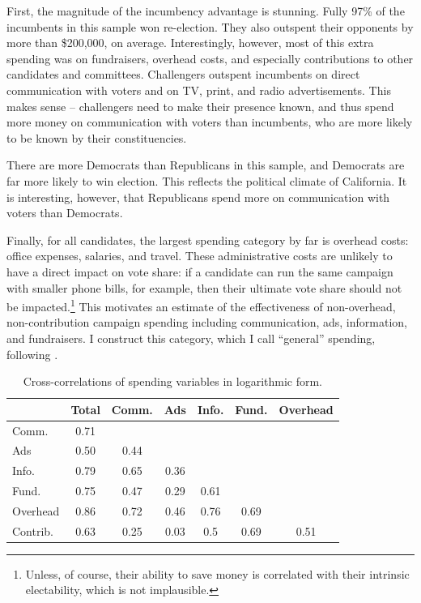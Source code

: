 \documentclass{article}
\begin{document}
First, the magnitude of the incumbency advantage is stunning. Fully 97\% of the incumbents in this sample won re-election. They also outspent their opponents by more than \$200,000, on average. Interestingly, however, most of this extra spending was on fundraisers, overhead costs, and especially contributions to other candidates and committees. Challengers outspent incumbents on direct communication with voters and on TV, print, and radio advertisements. This makes sense -- challengers need to make their presence known, and thus spend more money on communication with voters than incumbents, who are more likely to be known by their constituencies.

There are more Democrats than Republicans in this sample, and Democrats are far more likely to win election. This reflects the political climate of California. It is interesting, however, that Republicans spend more on communication with voters than Democrats.

Finally, for all candidates, the largest spending category by far is overhead costs: office expenses, salaries, and travel. These administrative costs are unlikely to have a direct impact on vote share: if a candidate can run the same campaign with smaller phone bills, for example, then their ultimate vote share should not be impacted.\footnote{Unless, of course, their ability to save money is correlated with their intrinsic electability, which is not implausible.} This motivates an estimate of the effectiveness of non-overhead, non-contribution campaign spending including communication, ads, information, and fundraisers. I construct this category, which I call ``general'' spending, following \cite{ansolabehere1994mismeasure}.

\begin{table}
\centering \caption{Cross-correlations of spending variables in logarithmic form. \label{table:corr}}
\begin{tabular}{l c  c  c  c  c  c  }\toprule
\multicolumn{1}{c}{} &Total&Comm.&Ads&Info.&Fund.&Overhead\\ \midrule
Comm.&0.71\\
Ads&0.50&0.44\\
Info.&0.79&0.65&0.36\\
Fund.&0.75&0.47&0.29&0.61\\
Overhead&0.86&0.72&0.46&0.76&0.69\\
Contrib.&0.63&0.25&0.03&0.5&0.69&0.51\\
\bottomrule

 \end{tabular}
\end{table}
\end{document}
